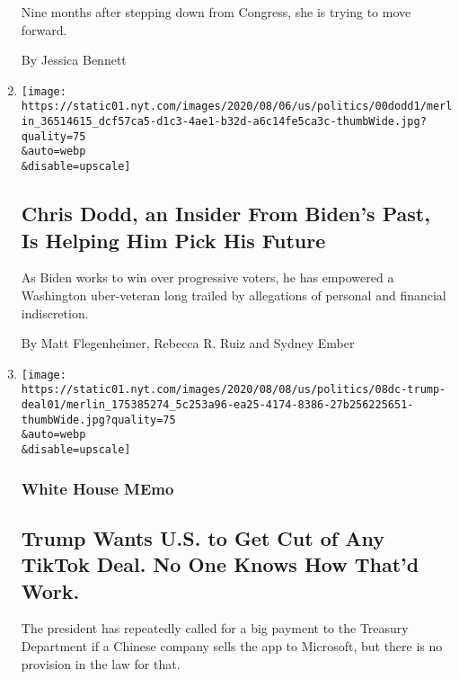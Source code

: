 \begin{enumerate}
  Nine months after stepping down from Congress, she is trying to move
  forward.

  By Jessica Bennett
\item
  \href{/2020/08/08/us/politics/biden-vp-chris-dodd.html}{}

  \texttt{[image: https://static01.nyt.com/images/2020/08/06/us/politics/00dodd1/merlin\_36514615\_dcf57ca5-d1c3-4ae1-b32d-a6c14fe5ca3c-thumbWide.jpg?quality=75\\\&auto=webp\\\&disable=upscale]}

  \hypertarget{chris-dodd-an-insider-from-bidens-past-is-helping-him-pick-his-future}{%
  \subsection{Chris Dodd, an Insider From Biden's Past, Is Helping Him
  Pick His
  Future}\label{chris-dodd-an-insider-from-bidens-past-is-helping-him-pick-his-future}}

  As Biden works to win over progressive voters, he has empowered a
  Washington uber-veteran long trailed by allegations of personal and
  financial indiscretion.

  By Matt Flegenheimer, Rebecca R. Ruiz and Sydney Ember
\item
  \href{/2020/08/08/us/politics/trump-tiktok-deal-treasury.html}{}

  \texttt{[image: https://static01.nyt.com/images/2020/08/08/us/politics/08dc-trump-deal01/merlin\_175385274\_5c253a96-ea25-4174-8386-27b256225651-thumbWide.jpg?quality=75\\\&auto=webp\\\&disable=upscale]}

  \hypertarget{white-house-memo}{%
  \subsubsection{White House MEmo}\label{white-house-memo}}

  \hypertarget{trump-wants-us-to-get-cut-of-any-tiktok-deal-no-one-knows-how-thatd-work}{%
  \subsection{Trump Wants U.S. to Get Cut of Any TikTok Deal. No One
  Knows How That'd
  Work.}\label{trump-wants-us-to-get-cut-of-any-tiktok-deal-no-one-knows-how-thatd-work}}

  The president has repeatedly called for a big payment to the Treasury
  Department if a Chinese company sells the app to Microsoft, but there
  is no provision in the law for that.


\end{enumerate}
